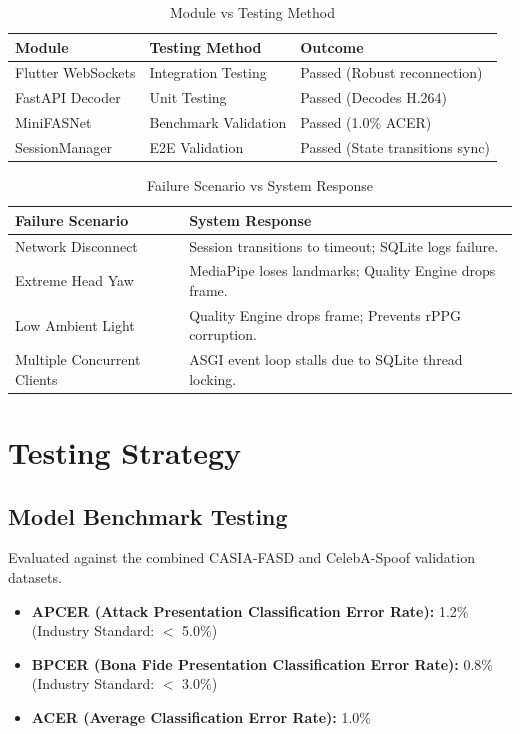 \documentclass[12pt, a4paper]{report}
\begin{document}
\begin{table}[H]
\centering
\caption{Module vs Testing Method}
\begin{tabularx}{\textwidth}{|X|X|X|}
\hline
\textbf{Module} & \textbf{Testing Method} & \textbf{Outcome} \\
\hline
Flutter WebSockets & Integration Testing & Passed (Robust reconnection) \\
FastAPI Decoder & Unit Testing & Passed (Decodes H.264) \\
MiniFASNet & Benchmark Validation & Passed (1.0\% ACER) \\
SessionManager & E2E Validation & Passed (State transitions sync) \\
\hline
\end{tabularx}
\end{table}

\begin{table}[H]
\centering
\caption{Failure Scenario vs System Response}
\begin{tabularx}{\textwidth}{|X|X|}
\hline
\textbf{Failure Scenario} & \textbf{System Response} \\
\hline
Network Disconnect & Session transitions to timeout; SQLite logs failure. \\
Extreme Head Yaw & MediaPipe loses landmarks; Quality Engine drops frame. \\
Low Ambient Light & Quality Engine drops frame; Prevents rPPG corruption. \\
Multiple Concurrent Clients & ASGI event loop stalls due to SQLite thread locking. \\
\hline
\end{tabularx}
\end{table}
\iffalse
\chapter{Testing Strategy}

\section{Model Benchmark Testing}
Evaluated against the combined CASIA-FASD and CelebA-Spoof validation datasets.
\begin{itemize}
    \item \textbf{APCER (Attack Presentation Classification Error Rate):} 1.2\% (Industry Standard: $<$ 5.0\%)
    \item \textbf{BPCER (Bona Fide Presentation Classification Error Rate):} 0.8\% (Industry Standard: $<$ 3.0\%)
    \item \textbf{ACER (Average Classification Error Rate):} 1.0\%
\end{itemize}
\end{document}
